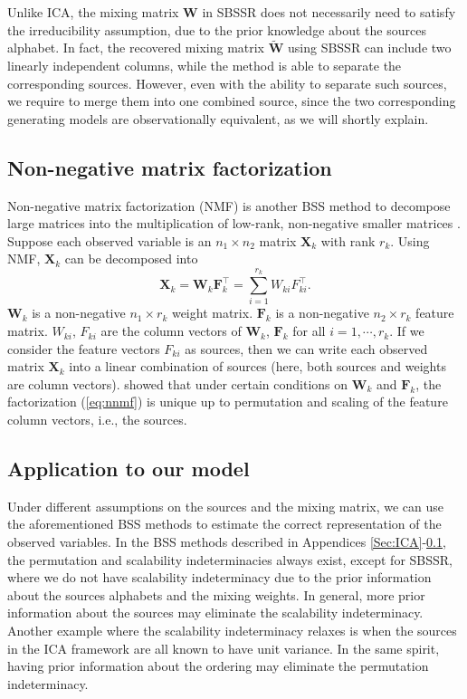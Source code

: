 \documentclass[12pt]{article}
\newcommand{\bW}{\mathbf{W}}
\begin{document}
Unlike ICA, the mixing matrix $\bW$ in SBSSR does not necessarily need to satisfy the irreducibility assumption, due to the prior knowledge about the sources alphabet. In fact, the recovered mixing matrix $\tilde{\bW}$ using SBSSR can include two linearly independent columns, while the method is able to separate the corresponding sources. However, even with the ability to separate such sources, we require to merge them into one combined source, since the two corresponding generating models are observationally equivalent, as we will shortly explain. 

\subsection{Non-negative matrix factorization}\label{Sec:NMF}
Non-negative matrix factorization (NMF) is another BSS method to decompose large matrices into the multiplication of low-rank, non-negative smaller matrices \citep{lee1999learning}. Suppose each observed variable is an $n_1 \times n_2$ matrix $\mathbf{X}_k$ with rank $r_k$. Using NMF, $\mathbf{X}_k$ can be decomposed into
\begin{equation}
\mathbf{X}_k = \mathbf{W}_k \mathbf{F}_k^{\top} = \sum_{i=1}^{r_k} W_{ki} F_{ki}^{\top}.
\label{eq:nnmf}
\end{equation}
$\mathbf{W}_k$ is a non-negative $n_1\times r_k$ weight matrix. $\mathbf{F}_k$ is a non-negative $n_2 \times r_k$ feature matrix. $W_{ki}$, $F_{ki}$ are the column vectors of $\mathbf{W}_k$, $\mathbf{F}_k$ for all $i=1,\cdots, r_k$. If we consider the feature vectors $F_{ki}$ as sources, then we can write each observed matrix $\mathbf{X}_k $ into a linear combination of sources (here, both sources and weights are column vectors). \citet{donoho2004does} showed that under certain conditions on $\mathbf{W}_k$ and $\mathbf{F}_k$, the factorization (\ref{eq:nnmf}) is unique up to permutation and scaling of the feature column vectors, i.e., the sources.

\subsection{Application to our model}\label{sec:application_to_our_model} 
Under different assumptions on the sources and the mixing matrix, we can use the aforementioned BSS methods to estimate the correct representation of the observed variables.
In the BSS methods described in Appendices \ref{Sec:ICA}-\ref{Sec:NMF}, the permutation and scalability indeterminacies always exist, except for SBSSR, where we do not have scalability indeterminacy due to the prior information about the sources alphabets and the mixing weights. In general, more prior information about the sources may eliminate the scalability indeterminacy. Another example where the scalability indeterminacy relaxes is when the sources in the ICA framework are all known to have unit variance. In the same spirit, having prior information about the ordering may eliminate the permutation indeterminacy. 
\end{document}
